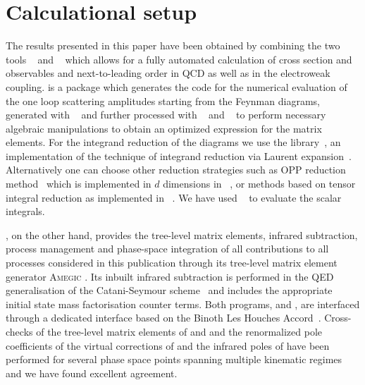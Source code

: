 \section{Calculational setup}
\label{sec:setup}
The results presented in this paper have been obtained by combining the two tools
\GoSam~\cite{Cullen:2011ac,Cullen:2014yla} and \Sherpa~\cite{Gleisberg:2008ta}
which allows for a fully automated calculation of cross section and observables and next-to-leading order in QCD as well
as in the electroweak coupling.
\GoSam is a package which generates the code for the numerical evaluation of
the one loop scattering amplitudes starting from the Feynman diagrams,
generated with \QGraf~\cite{Nogueira:1991ex} and further processed with
\FORM~\cite{Vermaseren:2000nd,Kuipers:2012rf} and
\Spinney~\cite{Cullen:2010jv} to perform necessary algebraic
manipulations to obtain an optimized expression for the matrix elements.
For the integrand reduction of the diagrams we use the \Ninja
library~\cite{Peraro:2014cba}, an implementation of the technique of integrand
reduction via Laurent expansion~\cite{Mastrolia:2012bu,vanDeurzen:2013saa}.
Alternatively one can choose other reduction strategies such as OPP reduction
method~\cite{Ossola:2006us,Mastrolia:2008jb,Ossola:2008xq} which is
implemented in $d$ dimensions in \Samurai~\cite{Mastrolia:2010nb}, or methods based on
tensor integral reduction as implemented in
\GolemNF~\cite{Heinrich:2010ax,Binoth:2008uq,Cullen:2011kv,Guillet:2013msa}.
We have used \OneLoop~\cite{vanHameren:2010cp} to evaluate the scalar integrals.

\Sherpa, on the other hand, provides the tree-level matrix 
elements, infrared subtraction, process management and phase-space 
integration of all contributions to all processes considered in 
this publication through its tree-level matrix element generator 
\textsc{Amegic} \cite{Krauss:2001iv}. 
Its inbuilt infrared subtraction is performed in the QED 
generalisation of the Catani-Seymour scheme~\cite{Catani:1996vz,
  Dittmaier:1999mb,Gleisberg:2007md,Kallweit:2014xda,
  Kallweit:2015dum,Kallweit:2017khh,Schonherr:2017xxx}
and includes the appropriate initial state mass factorisation 
counter terms.
Both programs, \Sherpa and \GoSam, are interfaced through a 
dedicated interface based on the 
Binoth Les Houches Accord~\cite{Binoth:2010xt,Alioli:2013nda}. 
Cross-checks of the tree-level matrix elements of \GoSam and 
\Sherpa and the renormalized pole coefficients of the virtual 
corrections of \GoSam and the infrared poles of \Sherpa have 
been performed for several phase space points spanning 
multiple kinematic regimes and we have found excellent 
agreement.

